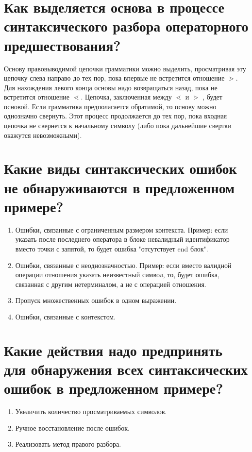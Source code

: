 \section{Как выделяется основа в процессе синтаксического разбора операторного предшествования?}

Основу правовыводимой цепочки грамматики можно выделить, просматривая эту цепочку слева направо до тех пор, пока впервые не встретится отношение $\gtrdot$. Для нахождения левого конца основы надо возвращаться назад, пока не встретится отношение $\lessdot$. Цепочка, заключенная между $\lessdot$ и $\gtrdot$ , будет основой. Если грамматика предполагается обратимой, то основу можно однозначно свернуть. Этот процесс продолжается до тех пор, пока входная цепочка не свернется к начальному символу (либо пока дальнейшие свертки окажутся невозможными).

\section{Какие виды синтаксических ошибок не обнаруживаются в предложенном примере?}

\begin{enumerate}
 \item Ошибки, связанные с ограниченным размером контекста. Пример: если указать после последнего оператора в блоке невалидный идентификатор вместо точки с запятой, то будет ошибка "отсутствует end блок".
 \item Ошибки, связанные с неоднозначностью. Пример: если вместо валидной операции отношения указать неизвестный символ, то, будет ошибка, связанная с другим нетерминалом, а не с операцией отношения.
 \item Пропуск множественных ошибок в одном выражении.
 \item Ошибки, связанные с контекстом.
\end{enumerate}

\section{Какие действия надо предпринять для обнаружения всех синтаксических ошибок в предложенном примере?}

\begin{enumerate}
 \item Увеличить количество просматриваемых символов.
 \item Ручное восстановление после ошибок.
 \item Реализовать метод правого разбора.
\end{enumerate}

